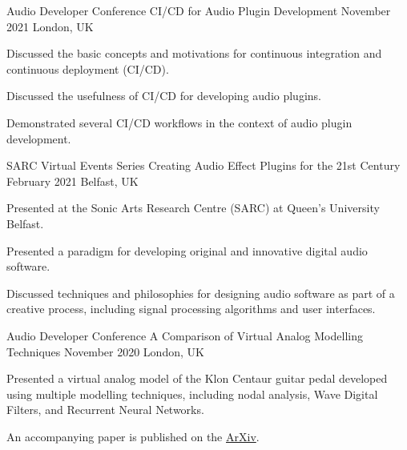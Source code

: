 

\begin{cventries}

  \cventry
    {Audio Developer Conference} %
    {CI/CD for Audio Plugin Development} %
    {November 2021} %
    {London, UK} %
    {
      \begin{cvitems} %
        \item {Discussed the basic concepts and motivations for continuous integration and continuous deployment (CI/CD).}
        \item {Discussed the usefulness of CI/CD for developing audio plugins.}
        \item {Demonstrated several CI/CD workflows in the context of audio plugin development.}
      \end{cvitems}
    }

  \cventry
    {SARC Virtual Events Series} %
    {Creating Audio Effect Plugins for the 21st Century} %
    {February 2021} %
    {Belfast, UK} %
    {
      \begin{cvitems} %
        \item {Presented at the Sonic Arts Research Centre (SARC) at Queen's University Belfast.}
        \item {Presented a paradigm for developing original and innovative digital audio software.}
        \item {Discussed techniques and philosophies for designing audio software as part of a creative process,
               including signal processing algorithms and user interfaces.}
      \end{cvitems}
    }

  \cventry
    {Audio Developer Conference} %
    {A Comparison of Virtual Analog Modelling Techniques} %
    {November 2020} %
    {London, UK} %
    {
      \begin{cvitems} %
        \item {Presented a virtual analog model of the Klon Centaur guitar pedal
               developed using multiple modelling techniques, including nodal
               analysis, Wave Digital Filters, and Recurrent Neural Networks.}
        \item {An accompanying paper is published on the \href{https://arxiv.org/abs/2009.02833}{ArXiv}.}
      \end{cvitems}
    }


\end{cventries}
